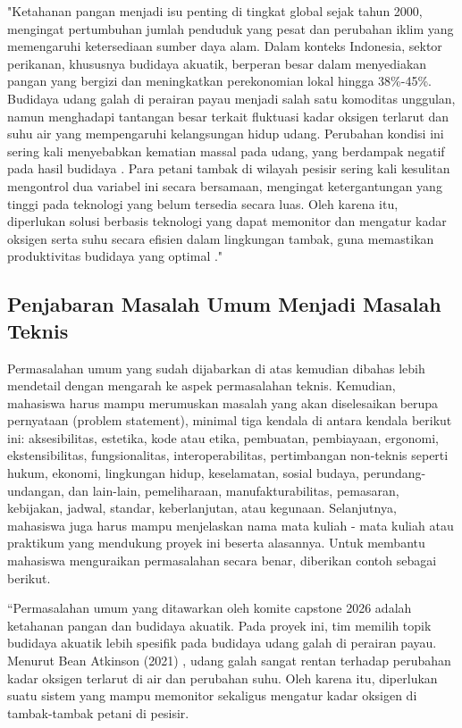     "Ketahanan pangan menjadi isu penting di tingkat global sejak tahun 2000, mengingat pertumbuhan jumlah penduduk yang pesat dan perubahan iklim yang memengaruhi ketersediaan sumber daya alam. Dalam konteks Indonesia, sektor perikanan, khususnya budidaya akuatik, berperan besar dalam menyediakan pangan yang bergizi dan meningkatkan perekonomian lokal hingga 38\%-45\%. Budidaya udang galah di perairan payau menjadi salah satu komoditas unggulan, namun menghadapi tantangan besar terkait fluktuasi kadar oksigen terlarut dan suhu air yang mempengaruhi kelangsungan hidup udang. Perubahan kondisi ini sering kali menyebabkan kematian massal pada udang, yang berdampak negatif pada hasil budidaya \cite{setiawan_ShrimpChallenge_2020}. Para petani tambak di wilayah pesisir sering kali kesulitan mengontrol dua variabel ini secara bersamaan, mengingat ketergantungan yang tinggi pada teknologi yang belum tersedia secara luas. Oleh karena itu, diperlukan solusi berbasis teknologi yang dapat memonitor dan mengatur kadar oksigen serta suhu secara efisien dalam lingkungan tambak, guna memastikan produktivitas budidaya yang optimal \cite{wahyuni_ChallengeAndImpact_2021, hidayat_FutureDirections_2019}."

    \subsection{Penjabaran Masalah Umum Menjadi Masalah Teknis} \label{subsec:Penjabaran_Masalah_Umum_Menjadi_Masalah_Teknis}

    Permasalahan umum yang sudah dijabarkan di atas kemudian dibahas lebih mendetail dengan mengarah ke aspek permasalahan teknis. Kemudian, mahasiswa harus mampu merumuskan masalah yang akan diselesaikan berupa pernyataan (problem statement), minimal tiga kendala di antara kendala berikut ini: aksesibilitas, estetika, kode atau etika, pembuatan, pembiayaan, ergonomi, ekstensibilitas, fungsionalitas, interoperabilitas, pertimbangan non-teknis seperti hukum, ekonomi, lingkungan hidup, keselamatan, sosial budaya, perundang-undangan, dan lain-lain, pemeliharaan, manufakturabilitas, pemasaran, kebijakan, jadwal, standar, keberlanjutan, atau kegunaan. Selanjutnya, mahasiswa juga harus mampu menjelaskan nama mata kuliah - mata kuliah atau praktikum yang mendukung proyek ini beserta alasannya. Untuk membantu mahasiswa menguraikan permasalahan secara benar, diberikan contoh sebagai berikut.
    \vspace{6pt}

    “Permasalahan umum yang ditawarkan oleh komite capstone 2026 adalah ketahanan pangan dan budidaya akuatik. Pada proyek ini, tim memilih topik budidaya akuatik lebih spesifik pada budidaya udang galah di perairan payau. Menurut Bean Atkinson (2021) \cite{bean_shrimp_2021_DummyRef}, udang galah sangat rentan terhadap perubahan kadar oksigen terlarut di air dan perubahan suhu. Oleh karena itu, diperlukan suatu sistem yang mampu memonitor sekaligus mengatur kadar oksigen di tambak-tambak petani di pesisir.


